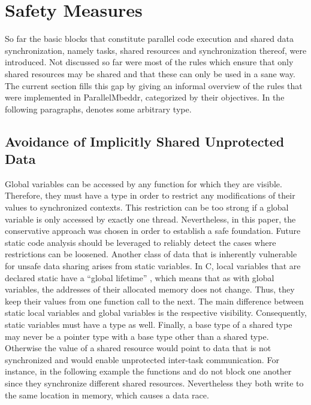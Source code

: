 \section{Safety Measures}
\label{safetyMeasures}
So far the basic blocks that constitute parallel code execution and shared data synchronization, namely tasks, shared resources and synchronization thereof, were introduced. Not discussed so far were most of the rules which ensure that only shared resources may be shared and that these can only be used in a sane way. The current section fills this gap by giving an informal overview of the rules that were implemented in ParallelMbeddr, categorized by their objectives. In the following paragraphs,  denotes some arbitrary type.

\subsection{Avoidance of Implicitly Shared Unprotected Data}
Global variables can be accessed by any function for which they are visible. Therefore, they must have a type  in order to restrict any modifications of their values to synchronized contexts. This restriction can be too strong if a global variable is only accessed by exactly one thread. Nevertheless, in this paper, the conservative approach was chosen in order to establish a safe foundation. Future static code analysis should be leveraged to reliably detect the cases where restrictions can be loosened.
Another class of data that is inherently vulnerable for unsafe data sharing arises from static variables. In C, local variables that are declared static have a ``global lifetime'' \cite[p.~439]{ProgrammingInC}, which means that as with global variables, the addresses of their allocated memory does not change. Thus, they keep their values from one function call to the next. The main difference between static local variables and global variables is the respective visibility. Consequently, static variables must have a type  as well.
Finally, a base type  of a shared type may never be a pointer type with a base type other than a shared type. Otherwise the value of a shared resource would point to data that is not synchronized and would enable unprotected inter-task communication. For instance, in the following example the functions  and  do not block one another since they synchronize different shared resources. Nevertheless they both write to the same location in memory, which causes a data race.

